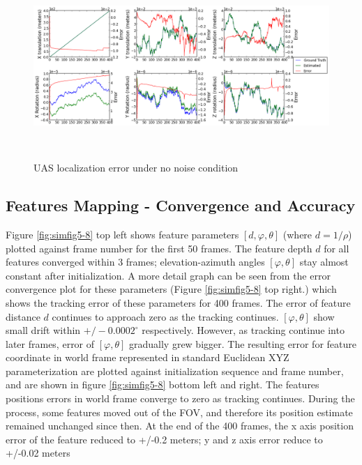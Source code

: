\begin{figure}[h]
\centering
\includegraphics[width=15cm, height=7cm]{./Figures/SimulationFigures/Figure1.png}
\caption{UAS localization error under no noise condition}
\label{fig:simfig1}
\end{figure}
\FloatBarrier

\subsection{Features Mapping - Convergence and Accuracy}
Figure \ref{fig:simfig5-8} top left shows feature parameters $[d, \varphi ,\theta]$ (where $d=1/\rho $) plotted against frame number for the first 50 frames. The feature depth $d$ for all features converged within 3 frames; elevation-azimuth angles $[\varphi ,\theta]$ stay almost constant after initialization. A more detail graph can be seen from the error convergence plot for these parameters (Figure \ref{fig:simfig5-8} top right.) which shows the tracking error of these parameters for 400 frames. The error of feature distance $d$ continues to approach zero as the tracking continues. $[\varphi ,\theta]$ show small drift within $+/-0.0002^{\circ}$ respectively. However, as tracking continue into later frames, error of $[\varphi ,\theta]$ gradually grew bigger. The resulting error for feature coordinate in world frame represented in standard Euclidean XYZ parameterization are plotted against initialization sequence and frame number, and are shown in figure \ref{fig:simfig5-8} bottom left and right. The features positions errors in world frame converge to zero as tracking continues. During the process, some features moved out of the FOV, and therefore its position estimate remained unchanged since then. At the end of the 400 frames, the x axis position error of the feature reduced to +/-0.2 meters; y and z axis error reduce to +/-0.02 meters

